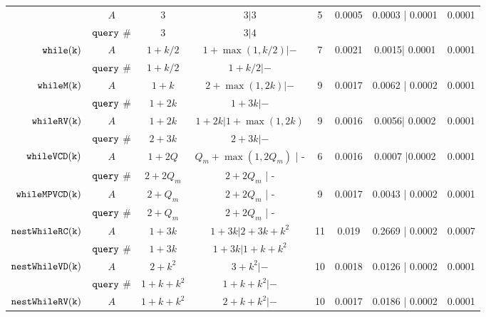 \begin {table}[H]
\begin{center}
{\begin{tabular}{ r | c | c | c | c | c | c | c  }
         & $A$ & $3$ & $3 | 3$  & 5 & 0.0005 & 0.0003 | 0.0001  & 0.0001 \\
         \cline{2-4}
         & ${\tt query}$ \#   & 3  &   $3| 4$ & & & & \\
         \hline
         $  \mathtt{while(k)}$ 
         & $A$ & $1+k/2$ & $1 +\max(1, k/2) |- $  & 7 & 0.0021 & 0.0015| 0.0001 &  0.0001 \\
         \cline{2-4}
         & ${\tt query}$ \#   &  $1+k/2$ &  $1+k/2 | - $  & & & & \\
         \hline
         $  \mathtt{whileM(k)}$ 
         & $A$ &  $1 + k$  & $ 2 + \max(1,2k) | -$  &  9 & 0.0017 & 0.0062 | 0.0002 & 0.0001  \\
         \cline{2-4}
         & ${\tt query}$ \#   & $1+2k $ & $1 + 3k | -$  & & & & \\
         \hline
         $  \mathtt{whileRV(k)}$ 
         & $A$ & $1 + 2k$ &  $1 + 2k| 1 + \max(1,2k)$  &  9 & 0.0016 & 0.0056| 0.0002 & 0.0001  \\
         \cline{2-4}
         & ${\tt query}$ \#   & {$2 + 3 k$} & $2 + 3 k| -$   & & & & \\
         \hline
         $  {\mathtt{whileVCD(k)}} $ 
         & $A$ & ${1 + 2Q}$ &  ${Q_m+\max(1,2Q_m)}$ | - &  6 & 0.0016 & 0.0007 |0.0002 & 0.0001 \\
         \cline{2-4}
         & ${\tt query}$ \#   &{$2+2Q_m$} & $2+2Q_m$ | -   & & & & \\
         \hline
         $ {\mathtt{whileMPVCD(k)}}$ 
         & $A$ &  $2 + Q_m$ & $2+2Q_m$ | -  &   9 & 0.0017 & 0.0043 | 0.0002 & 0.0001 \\
         \cline{2-4}
         & ${\tt query}$ \#   & $2+Q_m$ & $2+2Q_m$ | - & & & & \\
         \hline
         $\mathtt{nestWhileRC(k)}$ 
         & $A$ & $1 + 3k$ &  $1 + 3k | 2 + 3k + k^2$   &  11 & 0.019 & 0.2669 | 0.0002 & 0.0007 \\
         \cline{2-4}
         & ${\tt query}$ \#   & $1 + 3k$ &  $1 + 3k | 1 + k + k^2$ & & & & \\
         \hline
         $\mathtt{nestWhileVD(k)}$ 
         & $A$ & $2 + k^2$ &   $3 + k^2| -$    &  10 & 0.0018 & 0.0126 | 0.0002 & 0.0001  \\
         \cline{2-4}
         & ${\tt query}$ \#   & $1 + k + k^2$ & $1 + k + k^2|- $ & & & & \\
         \hline
         $\mathtt{nestWhileRV(k)}$ 
         & $A$ & $1 + k + k^2$ &  $ 2 + k +  k^2 | -$   &  10 & 0.0017 & 0.0186 | 0.0002 & 0.0001  \\
         \cline{2-4}

\end{tabular}}
\end{center}
\end{table}
